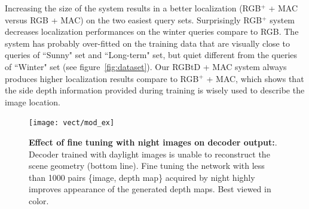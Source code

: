 

Increasing the size of the system results in a better localization (RGB$^{+}$ + MAC versus RGB + MAC) on the two easiest query sets. Surprisingly RGB$^{+}$ system decreases localization performances on the winter queries compare to RGB. The system has probably over-fitted on the training data that are visually close to queries of ``Sunny" set and ``Long-term" set, but quiet different from the queries of ``Winter" set (see figure~\ref{fig:dataset}). Our RGBtD + MAC system always produces higher localization results compare to RGB$^{+}$ + MAC, which shows that the side depth information provided during training is wisely used to describe the image location. 

\begin{figure}
	\center
	\texttt{[image: vect/mod\_ex]}	
	\caption{\label{fig:mod_ex} \textbf{Effect of fine tuning with night images on decoder output:}. Decoder trained with daylight images is unable to reconstruct the scene geometry (bottom line). Fine tuning the network with less than 1000 pairs \{image, depth map\} acquired by night highly improves appearance of the generated depth maps. Best viewed in color.}
\end{figure}

